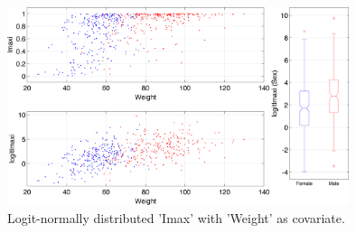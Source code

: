 \begin{figure}[htbp]
\centering
 \includegraphics[width=100mm]{pics/paramCovModel_ImaxlogImax_Weight}
\caption{Logit-normally distributed 'Imax' with 'Weight' as covariate.}
\label{fig:parameterCovModel3}
\end{figure}


